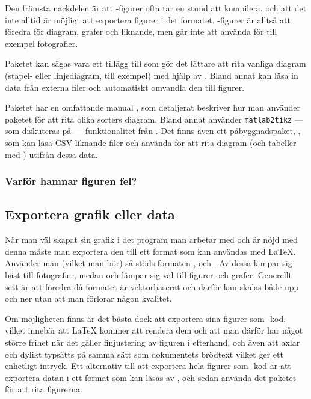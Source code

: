 \documentclass[lang=sv,ptsize=10pt,font=none,nomath,titles=bf,../../a4.tex]{subfiles}
\begin{document}
Den främsta nackdelen är att \PGFTikZ-figurer ofta tar en stund att
kompilera, och att det inte alltid är möjligt att exportera figurer
i det formatet. \PGFTikZ-figurer är alltså att föredra för diagram,
grafer och liknande, men går inte att använda för till exempel
fotografier.

Paketet  kan sägas vara ett tillägg till \PGFTikZ som gör
det lättare att rita vanliga diagram (stapel- eller linjediagram, till
exempel) med hjälp av \PGFTikZ. Bland annat kan  läsa in
data från externa filer och automatiskt omvandla den till figurer.

Paketet har en omfattande manual \parencite{Feuersanger13a}, som
detaljerat beskriver hur man använder paketet för att rita olika
sorters diagram.
Bland annat använder \texttt{matlab2tikz} — som diskuteras på
 — funktionalitet från .
Det finns även ett påbyggnadspaket, 
\parencite{Feuersanger13b}, som kan läsa
CSV-liknande filer och använda  för att rita diagram
(och tabeller med ) utifrån dessa data.

\subsubsection{Varför hamnar figuren fel?}

\subsection{Exportera grafik eller data}
När man väl skapat sin grafik i det program man arbetar med och är nöjd
med denna måste man exportera den till ett format som kan användas med
\LaTeX. Använder man \pdfLaTeX (vilket man bör) så stöds formaten \JPEG,
\PNG och \PDF. Av dessa lämpar sig \JPEG bäst till fotografier, medan
\PNG och \PDF lämpar sig väl till figurer och grafer.
Generellt sett är \PDF att föredra då formatet är vektorbaserat och
därför kan skalas både upp och ner utan att man förlorar någon kvalitet.

Om möjligheten finns är det bästa dock att exportera sina figurer som
\PGFTikZ-kod, vilket innebär att \LaTeX{} kommer att rendera dem och att
man därför har något större frihet när det gäller finjustering av figuren
i efterhand, och även att axlar och dylikt typsätts på samma sätt som
dokumentets brödtext vilket ger ett enhetligt intryck. Ett alternativ
till att exportera hela figurer som \PGFTikZ-kod är att exportera datan
i ett format som kan läsas av , och sedan använda det
paketet för att rita figurerna.
\end{document}
